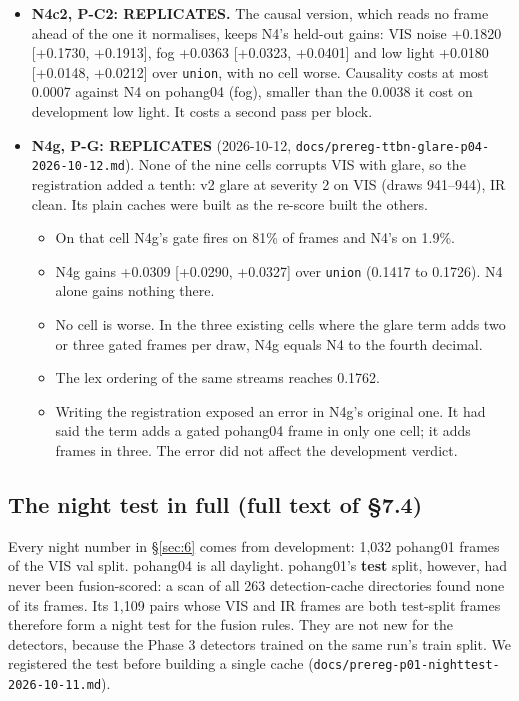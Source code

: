 \documentclass[10pt]{article}
\begin{document}
\begin{itemize}
\item \textbf{N4c2, P-C2: REPLICATES.} The causal version, which reads no frame ahead of the one it normalises, keeps N4's held-out gains: VIS noise +0.1820 [+0.1730, +0.1913], fog +0.0363 [+0.0323, +0.0401] and low light +0.0180 [+0.0148, +0.0212] over \texttt{union}, with no cell worse. Causality costs at most 0.0007 against N4 on pohang04 (fog), smaller than the 0.0038 it cost on development low light. It costs a second pass per block.
\item \textbf{N4g, P-G: REPLICATES} (2026-10-12, \texttt{docs/\allowbreak{}prereg-ttbn-glare-p04-2026-10-12.md}). None of the nine cells corrupts VIS with glare, so the registration added a tenth: v2 glare at severity 2 on VIS (draws 941--944), IR clean. Its plain caches were built as the re-score built the others.
\begin{itemize}
\item On that cell N4g's gate fires on 81\% of frames and N4's on 1.9\%.
\item N4g gains +0.0309 [+0.0290, +0.0327] over \texttt{union} (0.1417 to 0.1726). N4 alone gains nothing there.
\item No cell is worse. In the three existing cells where the glare term adds two or three gated frames per draw, N4g equals N4 to the fourth decimal.
\item The lex ordering of the same streams reaches 0.1762.
\item Writing the registration exposed an error in N4g's original one. It had said the term adds a gated pohang04 frame in only one cell; it adds frames in three. The error did not affect the development verdict.
\end{itemize}
\end{itemize}

\subsection{The night test in full (full text of \S7.4)}\label{app:K.4}
Every night number in \S\ref{sec:6} comes from development: 1,032 pohang01 frames of the VIS val split. pohang04 is all daylight. pohang01's \textbf{test} split, however, had never been fusion-scored: a scan of all 263 detection-cache directories found none of its frames. Its 1,109 pairs whose VIS and IR frames are both test-split frames therefore form a night test for the fusion rules. They are not new for the detectors, because the Phase 3 detectors trained on the same run's train split. We registered the test before building a single cache (\texttt{docs/\allowbreak{}prereg-p01-nighttest-2026-10-11.md}).
\end{document}
